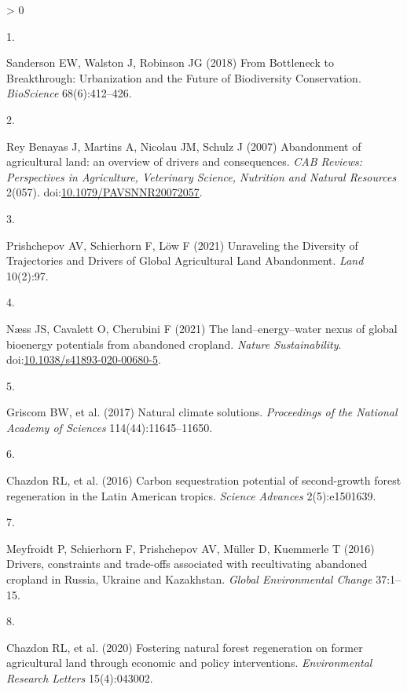 \documentclass[9pt,twocolumn,twoside,lineno]{pnas-new}
\newlength{\csllabelwidth}
\newlength{\cslhangindent}
\newenvironment{CSLReferences}[2] %
 {%
  \setlength{\parindent}{0pt}
  \ifodd #1 \everypar{\setlength{\hangindent}{\cslhangindent}}\ignorespaces\fi
  \ifnum #2 > 0
  \setlength{\parskip}{#2\baselineskip}
  \fi
 }%
 {}
\newcommand{\CSLLeftMargin}[1]{\parbox[t]{\csllabelwidth}{#1}}
\newcommand{\CSLRightInline}[1]{\parbox[t]{\linewidth - \csllabelwidth}{#1}\break}
\begin{document}
\hypertarget{refs}{}
\begin{CSLReferences}{0}{0}
\leavevmode\hypertarget{ref-Sanderson2018}{}%
\CSLLeftMargin{1. }
\CSLRightInline{Sanderson EW, Walston J, Robinson JG (2018) {From Bottleneck to Breakthrough: Urbanization and the Future of Biodiversity Conservation}. \emph{BioScience} 68(6):412--426.}

\leavevmode\hypertarget{ref-ReyBenayas2007}{}%
\CSLLeftMargin{2. }
\CSLRightInline{Rey Benayas J, Martins A, Nicolau JM, Schulz J (2007) {Abandonment of agricultural land: an overview of drivers and consequences.} \emph{CAB Reviews: Perspectives in Agriculture, Veterinary Science, Nutrition and Natural Resources} 2(057). doi:\href{https://doi.org/10.1079/PAVSNNR20072057}{10.1079/PAVSNNR20072057}.}

\leavevmode\hypertarget{ref-Prishchepov2021}{}%
\CSLLeftMargin{3. }
\CSLRightInline{Prishchepov AV, Schierhorn F, Löw F (2021) {Unraveling the Diversity of Trajectories and Drivers of Global Agricultural Land Abandonment}. \emph{Land} 10(2):97.}

\leavevmode\hypertarget{ref-Naess2021}{}%
\CSLLeftMargin{4. }
\CSLRightInline{Næss JS, Cavalett O, Cherubini F (2021) {The land--energy--water nexus of global bioenergy potentials from abandoned cropland}. \emph{Nature Sustainability}. doi:\href{https://doi.org/10.1038/s41893-020-00680-5}{10.1038/s41893-020-00680-5}.}

\leavevmode\hypertarget{ref-Griscom2017}{}%
\CSLLeftMargin{5. }
\CSLRightInline{Griscom BW, et al. (2017) {Natural climate solutions}. \emph{Proceedings of the National Academy of Sciences} 114(44):11645--11650.}

\leavevmode\hypertarget{ref-Chazdon2016a}{}%
\CSLLeftMargin{6. }
\CSLRightInline{Chazdon RL, et al. (2016) {Carbon sequestration potential of second-growth forest regeneration in the Latin American tropics}. \emph{Science Advances} 2(5):e1501639.}

\leavevmode\hypertarget{ref-Meyfroidt2016}{}%
\CSLLeftMargin{7. }
\CSLRightInline{Meyfroidt P, Schierhorn F, Prishchepov AV, Müller D, Kuemmerle T (2016) {Drivers, constraints and trade-offs associated with recultivating abandoned cropland in Russia, Ukraine and Kazakhstan}. \emph{Global Environmental Change} 37:1--15.}

\leavevmode\hypertarget{ref-Chazdon2020}{}%
\CSLLeftMargin{8. }
\CSLRightInline{Chazdon RL, et al. (2020) {Fostering natural forest regeneration on former agricultural land through economic and policy interventions}. \emph{Environmental Research Letters} 15(4):043002.}


\end{CSLReferences}
\end{document}
